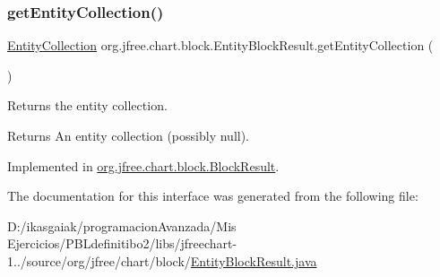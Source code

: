 \subsubsection{\texorpdfstring{get\+Entity\+Collection()}{getEntityCollection()}}
{\footnotesize\ttfamily \mbox{\hyperlink{interfaceorg_1_1jfree_1_1chart_1_1entity_1_1_entity_collection}{Entity\+Collection}} org.\+jfree.\+chart.\+block.\+Entity\+Block\+Result.\+get\+Entity\+Collection (\begin{DoxyParamCaption}{ }\end{DoxyParamCaption})}

Returns the entity collection.

\begin{DoxyReturn}{Returns}
An entity collection (possibly {\ttfamily null}). 
\end{DoxyReturn}


Implemented in \mbox{\hyperlink{classorg_1_1jfree_1_1chart_1_1block_1_1_block_result_a5c6323fdf9c8638e8e00876f495da5f8}{org.\+jfree.\+chart.\+block.\+Block\+Result}}.



The documentation for this interface was generated from the following file\+:\begin{DoxyCompactItemize}
\item 
D\+:/ikasgaiak/programacion\+Avanzada/\+Mis Ejercicios/\+P\+B\+Ldefinitibo2/libs/jfreechart-\/1../source/org/jfree/chart/block/\mbox{\hyperlink{_entity_block_result_8java}{Entity\+Block\+Result.\+java}}\end{DoxyCompactItemize}
